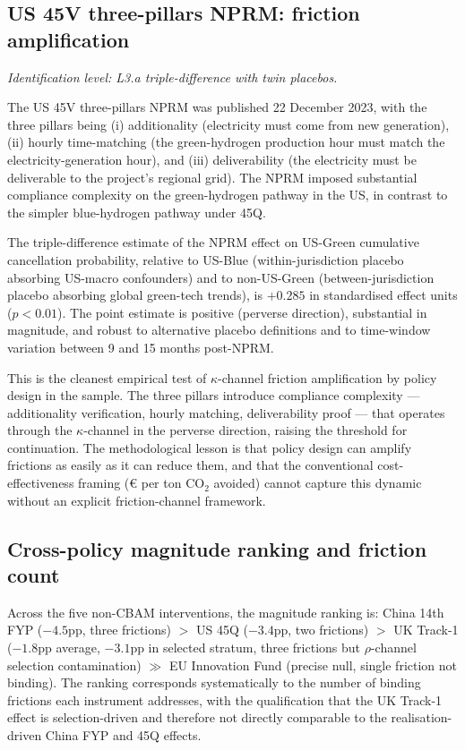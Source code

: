 \documentclass[12pt,a4paper]{article}
\theoremstyle{plain}
\theoremstyle{definition}
\begin{document}
\subsection{US 45V three-pillars NPRM: friction amplification}
\label{sec:results-45v}

\noindent\emph{Identification level: L3.a triple-difference with twin placebos.}

The US 45V three-pillars NPRM was published 22 December 2023, with the three pillars being (i) additionality (electricity must come from new generation), (ii) hourly time-matching (the green-hydrogen production hour must match the electricity-generation hour), and (iii) deliverability (the electricity must be deliverable to the project's regional grid). The NPRM imposed substantial compliance complexity on the green-hydrogen pathway in the US, in contrast to the simpler blue-hydrogen pathway under 45Q.

The triple-difference estimate of the NPRM effect on US-Green cumulative cancellation probability, relative to US-Blue (within-jurisdiction placebo absorbing US-macro confounders) and to non-US-Green (between-jurisdiction placebo absorbing global green-tech trends), is $+0.285$ in standardised effect units ($p < 0.01$). The point estimate is positive (perverse direction), substantial in magnitude, and robust to alternative placebo definitions and to time-window variation between 9 and 15 months post-NPRM.

This is the cleanest empirical test of $\kappa$-channel friction amplification by policy design in the sample. The three pillars introduce compliance complexity --- additionality verification, hourly matching, deliverability proof --- that operates through the $\kappa$-channel in the perverse direction, raising the threshold for continuation. The methodological lesson is that policy design can amplify frictions as easily as it can reduce them, and that the conventional cost-effectiveness framing (€ per ton CO$_2$ avoided) cannot capture this dynamic without an explicit friction-channel framework.

\subsection{Cross-policy magnitude ranking and friction count}
\label{sec:results-cross-policy}

Across the five non-CBAM interventions, the magnitude ranking is: China 14th FYP ($-4.5$pp, three frictions) $>$ US 45Q ($-3.4$pp, two frictions) $>$ UK Track-1 ($-1.8$pp average, $-3.1$pp in selected stratum, three frictions but $\rho$-channel selection contamination) $\gg$ EU Innovation Fund (precise null, single friction not binding). The ranking corresponds systematically to the number of binding frictions each instrument addresses, with the qualification that the UK Track-1 effect is selection-driven and therefore not directly comparable to the realisation-driven China FYP and 45Q effects.
\end{document}
